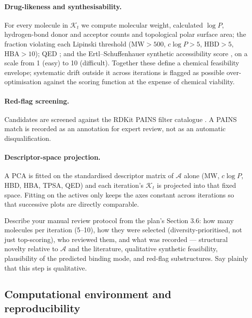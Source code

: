 \documentclass[11pt]{article}
\newcommand{\Actives}{\mathcal{A}}              %
\newcommand{\TopK}{\mathcal{K}}                 %
\begin{document}
\paragraph{Drug-likeness and synthesisability.}
For every molecule in $\TopK_t$ we compute molecular weight, calculated
$\log P$, hydrogen-bond donor and acceptor counts and topological polar surface
area; the fraction violating each Lipinski threshold \citep{lipinski1997}
($\mathrm{MW} > 500$, $c\log P > 5$, $\mathrm{HBD} > 5$, $\mathrm{HBA} > 10$);
QED \citep{bickerton2012}; and the Ertl--Schuffenhauer synthetic accessibility
score \citep{ertl2009}, on a scale from 1 (easy) to 10 (difficult). Together
these define a chemical feasibility envelope; systematic drift outside it across
iterations is flagged as possible over-optimisation against the scoring
function at the expense of chemical viability.

\paragraph{Red-flag screening.}
Candidates are screened against the RDKit PAINS filter catalogue
\citep{baell2010}. A PAINS match is recorded as an annotation for expert review,
not as an automatic disqualification.

\paragraph{Descriptor-space projection.}
A PCA is fitted on the standardised descriptor matrix of $\Actives$ alone
(MW, $c\log P$, HBD, HBA, TPSA, QED) and each iteration's $\TopK_t$ is projected
into that fixed space. Fitting on the actives only keeps the axes constant
across iterations so that successive plots are directly comparable.

\begin{yourturn}
Describe your manual review protocol from the plan's Section 3.6: how many
molecules per iteration (5--10), how they were selected (diversity-prioritised,
not just top-scoring), who reviewed them, and what was recorded --- structural
novelty relative to $\Actives$ and the literature, qualitative synthetic
feasibility, plausibility of the predicted binding mode, and red-flag
substructures. Say plainly that this step is qualitative.
\end{yourturn}

\subsection{Computational environment and reproducibility}
\label{sec:methods:compute}
\end{document}
